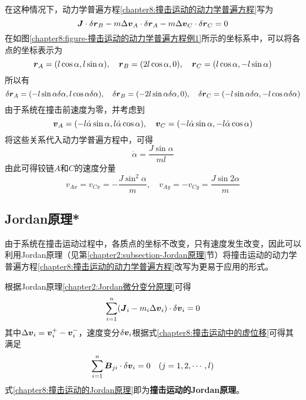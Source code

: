 \begin{solution}
在这种情况下，动力学普遍方程\eqref{chapter8:撞击运动的动力学普遍方程}写为
\begin{equation*}
	\boldsymbol{J}\cdot \delta\boldsymbol{r}_B - m\Delta\boldsymbol{v}_A\cdot \delta\boldsymbol{r}_A - m\Delta\boldsymbol{v}_C\cdot \delta\boldsymbol{r}_C = 0
\end{equation*}
在如图\ref{chapter8:figure-撞击运动的动力学普遍方程例1}所示的坐标系中，可以将各点的坐标表示为
\begin{equation*}
	\boldsymbol{r}_A = (l\cos\alpha,l\sin\alpha),\quad \boldsymbol{r}_B = (2l\cos\alpha,0),\quad \boldsymbol{r}_C = (l\cos\alpha,-l\sin\alpha)
\end{equation*}
所以有
\begin{equation*}
	\delta\boldsymbol{r}_A = (-l\sin\alpha\delta\alpha,l\cos\alpha\delta\alpha),\quad \delta\boldsymbol{r}_B = (-2l\sin\alpha\delta\alpha,0),\quad \delta\boldsymbol{r}_C = (-l\sin\alpha\delta\alpha,-l\cos\alpha\delta\alpha)
\end{equation*}
由于系统在撞击前速度为零，并考虑到
\begin{equation*}
	\boldsymbol{v}_A = (-l\dot{\alpha}\sin\alpha,l\dot{\alpha}\cos\alpha),\quad \boldsymbol{v}_C = (-l\dot{\alpha}\sin\alpha,-l\dot{\alpha}\cos\alpha)
\end{equation*}
将这些关系代入动力学普遍方程中，可得
\begin{equation*}
	\dot{\alpha} = \frac{J\sin\alpha}{ml}
\end{equation*}
由此可得铰链$A$和$C$的速度分量
\begin{equation*}
	v_{Ax} = v_{Cx} = -\frac{J\sin^2\alpha}{m},\quad v_{Ay} = -v_{Cy} = \frac{J\sin2\alpha}{m}
\end{equation*}
\end{solution}

\subsection{Jordan原理*}

由于系统在撞击运动过程中，各质点的坐标不改变，只有速度发生改变，因此可以利用Jordan原理（见第\ref{chapter2:subsection-Jordan原理}节）将撞击运动的动力学普遍方程\eqref{chapter8:撞击运动的动力学普遍方程}改写为更易于应用的形式。

根据Jordan原理\eqref{chapter2:Jordan微分变分原理}可得
\begin{equation}
	\sum_{i=1}^n (\boldsymbol{J}_i-m_i\Delta\boldsymbol{v}_i) \cdot \delta\boldsymbol{v}_i = 0
	\label{chapter8:撞击运动的Jordan原理}
\end{equation}
其中$\Delta\boldsymbol{v}_i = \boldsymbol{v}_i^+-\boldsymbol{v}_i^-$，速度变分$\delta\boldsymbol{v}_i$根据式\eqref{chapter8:撞击运动中的虚位移}可得其满足
\begin{equation}
	\sum_{i=1}^n \boldsymbol{B}_{ji}\cdot \delta\boldsymbol{v}_i = 0\quad (j=1,2,\cdots,l)
	\label{chapter8:速度变分满足的关系式}
\end{equation}
式\eqref{chapter8:撞击运动的Jordan原理}即为{\bf 撞击运动的Jordan原理}。

